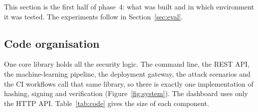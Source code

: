 
This section is the first half of phase~4: what was built and in which environment it was tested. The
experiments follow in Section~\ref{sec:eval}.

\subsection{Code organisation}
One core library holds all the security logic. The command line, the REST API, the machine-learning pipeline,
the deployment gateway, the attack scenarios and the CI workflows call that same library, so there is exactly
one implementation of hashing, signing and verification (Figure~\ref{fig:system}). The dashboard uses only the
HTTP API. Table~\ref{tab:code} gives the size of each component.

